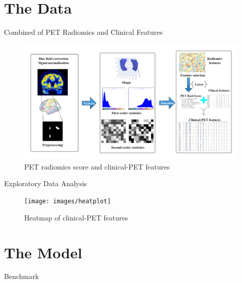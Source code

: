 \documentclass[
  11pt,
  ignorenonframetext,
  fontset=fandol]{beamer}
\begin{document}
\hypertarget{the-data}{%
\section{The Data}\label{the-data}}

\begin{frame}{Combined of PET Radiomics and Clinical Features}
\protect\hypertarget{combined-of-pet-radiomics-and-clinical-features}{}
\begin{figure}

{\centering \includegraphics[width=1.1\linewidth]{images/PET_radiomics} 

}

\caption{PET radiomics  score and clinical-PET features}\label{fig:unnamed-chunk-5}
\end{figure}
\end{frame}

\begin{frame}{Exploratory Data Analysis}
\protect\hypertarget{exploratory-data-analysis}{}
\begin{figure}

{\centering \texttt{[image: images/heatplot]} 

}

\caption{Heatmap of clinical-PET features}\label{fig:unnamed-chunk-6}
\end{figure}
\end{frame}

\hypertarget{the-model}{%
\section{The Model}\label{the-model}}

\begin{frame}{Benchmark}
\protect\hypertarget{benchmark}{}
\end{frame}
\end{document}
